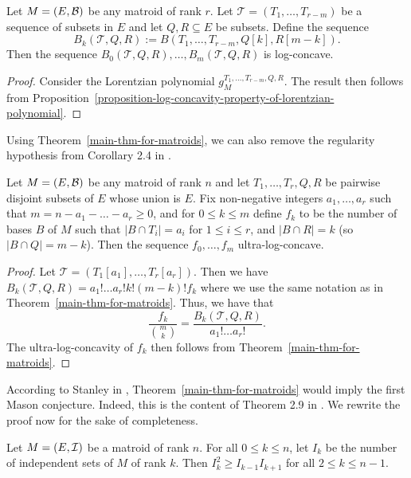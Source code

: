 \documentclass{puthesis-UG}
\begin{document}
\begin{thm} \label{main-thm-for-matroids}
	Let $M = (E, \mathcal{B})$ be any matroid of rank $r$. Let $\mathcal{T} = (T_1, \ldots, T_{r-m})$ be a sequence of subsets in $E$ and let $Q, R \subseteq E$ be subsets. Define the sequence
	\[	
		B_k(\mathcal{T}, Q, R) := B(T_1, \ldots, T_{r-m}, Q[k], R [m-k]).
	\]
	Then the sequence $B_0(\mathcal{T}, Q, R), \ldots, B_m(\mathcal{T}, Q, R)$ is log-concave. 
\end{thm}

\begin{proof}
	Consider the Lorentzian polynomial $g_M^{T_1, \ldots, T_{r-m}, Q, R}$. The result then follows from Proposition~\ref{proposition-log-concavity-property-of-lorentzian-polynomial}. 
\end{proof}

Using Theorem~\ref{main-thm-for-matroids}, we can also remove the regularity hypothesis from Corollary 2.4 in \cite{STANLEY}. 

\begin{cor} \label{cor-ultra-log-concavity-of-some-sequence-related-to-bases}
	Let $M = (E, \mathcal{B})$ be any matroid of rank $n$ and let $T_1, \ldots, T_r, Q, R$ be pairwise disjoint subsets of $E$ whose union is $E$. Fix non-negative integers $a_1, \ldots, a_r$ such that $m = n - a_1 - \ldots - a_r \geq 0$, and for $0 \leq k \leq m$ define $f_k$ to be the number of bases $B$ of $M$ such that $|B \cap T_i| = a_i$ for $1 \leq i \leq r$, and $|B \cap R| = k$ (so $|B \cap Q| = m-k$). Then the sequence $f_0, \ldots, f_m$ ultra-log-concave. 
\end{cor}
	
\begin{proof}
	Let $\mathcal{T} = (T_1[a_1], \ldots, T_r[a_r])$. Then we have $B_k(\mathcal{T}, Q, R) = a_1! \ldots a_r! k! (m-k)! f_k$ where we use the same notation as in Theorem~\ref{main-thm-for-matroids}. Thus, we have that
	\[	
		\frac{f_k}{\binom{m}{k}} = \frac{B_k(\mathcal{T}, Q, R)}{a_1 ! \ldots a_r!}.
	\]
	The ultra-log-concavity of $f_k$ then follows from Theorem~\ref{main-thm-for-matroids}. 
\end{proof}

According to Stanley in \cite{STANLEY}, Theorem~\ref{main-thm-for-matroids} would imply the first Mason conjecture. Indeed, this is the content of Theorem 2.9 in \cite{STANLEY}. We rewrite the proof now for the sake of completeness. 

\begin{thm}
	Let $M = (E, \mathcal{I})$ be a matroid of rank $n$. For all $0 \leq k \leq n$, let $I_k$ be the number of independent sets of $M$ of rank $k$. Then $I_k^2 \geq I_{k-1} I_{k+1}$ for all $2 \leq k \leq n-1$. 
\end{thm}
\end{document}
